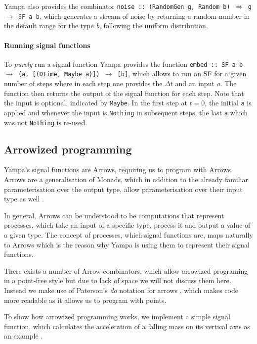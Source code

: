 Yampa also provides the combinator \texttt{noise :: (RandomGen g, Random b) $\Rightarrow$ g $\rightarrow$ SF a b}, which generates a stream of noise by returning a random number in the default range for the type \textit{b}, following the uniform distribution.

\paragraph{Running signal functions}
To \textit{purely} run a signal function Yampa provides the function \texttt{embed :: SF a b $\rightarrow$ (a, [(DTime, Maybe a)]) $\rightarrow$ [b]}, which allows to run an SF for a given number of steps where in each step one provides the $\Delta t$ and an input \textit{a}. The function then returns the output of the signal function for each step. Note that the input is optional, indicated by \texttt{Maybe}. In the first step at $t = 0$, the initial \texttt{a} is applied and whenever the input is \texttt{Nothing} in subsequent steps, the last \texttt{a} which was not \texttt{Nothing} is re-used.

\subsection{Arrowized programming}
Yampa's signal functions are Arrows, requiring us to program with Arrows. Arrows are a generalisation of Monads, which in addition to the already familiar parameterisation over the output type, allow parameterisation over their input type as well \cite{hughes_generalising_2000, hughes_programming_2005}.

In general, Arrows can be understood to be computations that represent processes, which take an input of a specific type, process it and output a value of a given type. The concept of processes, which signal functions are, maps naturally to Arrows which is the reason why Yampa is using them to represent their signal functions.

There exists a number of Arrow combinators, which allow arrowized programing in a point-free style but due to lack of space we will not discuss them here. Instead we make use of Paterson's \textit{do} notation for arrows \cite{paterson_new_2001}, which makes code more readable as it allows us to program with points.

To show how arrowized programming works, we implement a simple signal function, which calculates the acceleration of a falling mass on its vertical axis as an example \cite{perez_testing_2017}.


